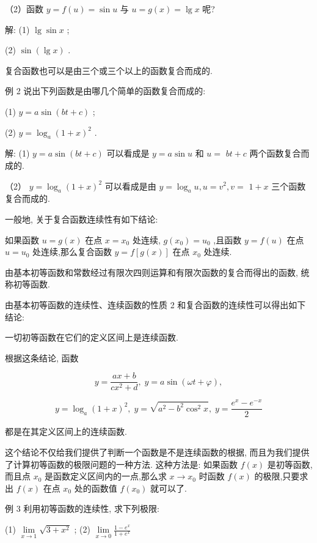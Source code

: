 \documentclass[lang=cn,newtx,10pt,scheme=chinese]{elegantbook}
\begin{document}
（2）函数 \(y = f\left( u\right) = \sin u\) 与 \(u = g\left( x\right) = \lg x\) 呢?

解: (1) \(\lg \sin x\) ;

(2) \(\sin \left( {\lg x}\right)\) .

复合函数也可以是由三个或三个以上的函数复合而成的.

例 2 说出下列函数是由哪几个简单的函数复合而成的:

(1) \(y = a\sin \left( {{bt} + c}\right)\) ;

(2) \(y = {\log }_{a}{\left( 1 + x\right) }^{2}\) .

解: (1) \(y = a\sin \left( {{bt} + c}\right)\) 可以看成是 \(y = a\sin u\) 和 \(u =\) \({bt} + c\) 两个函数复合而成的.

（2） \(y = {\log }_{a}{\left( 1 + x\right) }^{2}\) 可以看成是由 \(y = {\log }_{a}u,u = {v}^{2},v =\) \(1 + x\) 三个函数复合而成的.

一般地, 关于复合函数连续性有如下结论:

如果函数 \(u = g\left( x\right)\) 在点 \(x = {x}_{0}\) 处连续, \(g\left( {x}_{0}\right) = {u}_{0}\) ,且函数 \(y = f\left( u\right)\) 在点 \(u = {u}_{0}\) 处连续,那么复合函数 \(y = f\left\lbrack {g\left( x\right) }\right\rbrack\) 在点 \({x}_{0}\) 处连续.

由基本初等函数和常数经过有限次四则运算和有限次函数的复合而得出的函数, 统称初等函数.

由基本初等函数的连续性、连续函数的性质 2 和复合函数的连续性可以得出如下结论:

一切初等函数在它们的定义区间上是连续函数.

根据这条结论, 函数

\[
y = \frac{{ax} + b}{c{x}^{2} + d},\;y = a\sin \left( {{\omega t} + \varphi }\right) ,
\]

\[
y = {\log }_{a}{\left( 1 + x\right) }^{2},\;y = \sqrt{{a}^{2} - {b}^{2}{\cos }^{2}x},\;y = \frac{{e}^{x} - {e}^{-x}}{2}
\]

都是在其定义区间上的连续函数.

这个结论不仅给我们提供了判断一个函数是不是连续函数的根据, 而且为我们提供了计算初等函数的极限问题的一种方法. 这种方法是: 如果函数 \(f\left( x\right)\) 是初等函数,而且点 \({x}_{0}\) 是函数定义区间内的一点,那么求 \(x \rightarrow {x}_{0}\) 时函数 \(f\left( x\right)\) 的极限,只要求出 \(f\left( x\right)\) 在点 \({x}_{0}\) 处的函数值 \(f\left( {x}_{0}\right)\) 就可以了.

例 3 利用初等函数的连续性, 求下列极限:

(1) \(\mathop{\lim }\limits_{{x \rightarrow 1}}\sqrt{3 + {x}^{2}}\) ; (2) \(\mathop{\lim }\limits_{{x \rightarrow 0}}\frac{1 - {e}^{x}}{1 + {e}^{x}}\)
\end{document}
